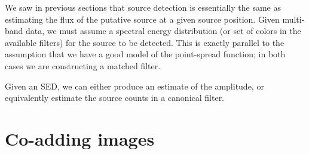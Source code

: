 \documentclass[letterpaper,preprint]{aastex}
\newcommand{\detmap}{detection map}
\newcommand{\psf}{\psi}
\newcommand{\snr}[1]{\mathbb{SN}(#1)}
\newcommand{\norm}[1]{\left\lVert #1 \right\rVert}
\newcommand{\commentout}[1]{}
\begin{document}
\commentout{
In previous sections, we have seen that the signal-to-noise in a
\detmap\ $D_i$ at the true location of a source is proportional to:
\begin{equation}
\snr{D_i} \propto \frac{r_i \sqrt{t_i}}{w_i \sqrt{s_i}} \quad ,
\end{equation}
where $r_i$ is the count rate, given the filter and sensitivity of
image $i$, $t_i$ is the exposure time, $w_i$ is the ``width'' of the
point-spread function ($1/\norm{\psf}$, proportional to $w$ for a
Gaussian point-spread function with standard deviation $w$), and $s_i$
is the sky count rate (see equations \ref{eqn:sndsingle},
\ref{eqn:sndsinglegauss}, and \ref{eqn:snimg}).

As in previous sections, we combine these \detmap s, weighting
by their squared signal-to-noise, to find the total \detmap\ 
$D^\star$:
\begin{equation}
D^{\star} = \sum_i D_i \, \frac{r_i^2 \, t_i}{w_i^2 \, s_i}
\end{equation}
}




We saw in previous sections that source detection is essentially the
same as estimating the flux of the putative source at a given source
position.  Given multi-band data, we must assume a spectral energy
distribution (or set of colors in the available filters) for the
source to be detected.  This is exactly parallel to the assumption
that we have a good model of the point-spread function; in both cases
we are constructing a matched filter.

Given an SED, we can either produce an estimate of the amplitude, or
equivalently estimate the source counts in a canonical filter.







\newpage



\section{Co-adding images}
\end{document}
